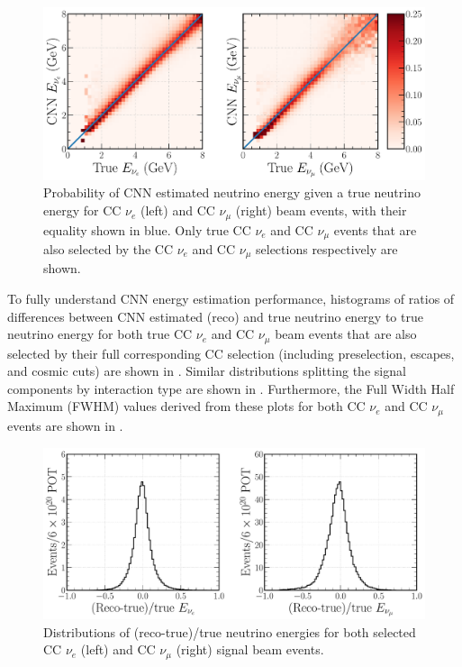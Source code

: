 \begin{figure} %
    \includegraphics[width=\textwidth]{diagrams/7-results/final_energy_2d.pdf}
    \caption[Probability of CNN estimated neutrino energy given a true neutrino energy]
    {Probability of CNN estimated neutrino energy given a true neutrino energy for CC $\nu_{e}$
        (left) and CC $\nu_{\mu}$ (right) beam events, with their equality shown in blue. Only
        true CC $\nu_{e}$ and CC $\nu_{\mu}$ events that are also selected by the CC $\nu_{e}$ and
        CC $\nu_{\mu}$ selections respectively are shown.}
    \label{fig:final_energy_2d}
\end{figure}

To fully understand CNN energy estimation performance, histograms of ratios of differences between
CNN estimated (reco) and true neutrino energy to true neutrino energy for both true CC $\nu_{e}$
and CC $\nu_{\mu}$ beam events that are also selected by their full corresponding CC selection
(including preselection, escapes, and cosmic cuts) are shown in .
Similar distributions splitting the signal components by interaction type are shown in
. Furthermore, the Full Width Half Maximum (FWHM) values
derived from these plots for both CC $\nu_{e}$ and CC $\nu_{\mu}$ events are shown in
.

\begin{figure} %
    \includegraphics[width=\textwidth]{diagrams/7-results/final_energy_frac.pdf}
    \caption[Distributions of (reco-true)/true neutrino energies]
    {Distributions of (reco-true)/true neutrino energies for both selected CC $\nu_{e}$ (left) and
        CC $\nu_{\mu}$ (right) signal beam events.}
    \label{fig:final_energy_frac}
\end{figure}

